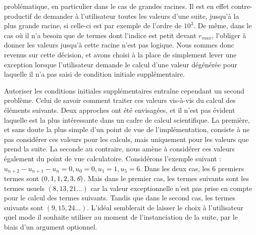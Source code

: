 \documentclass[12pt]{article}
\begin{document}
        problématique, en particulier dans le cas de grandes racines. Il est en effet
        contre-productif de demander à l'utilisateur toutes les valeurs d'une suite,
        jusqu'à la plus grande racine, si celle-ci est par exemple de l'ordre de $10^3$.
        De même, dans le cas où il n'a besoin que de termes dont l'indice est petit devant
        $r_{max}$, l'obliger à donner les valeurs jusqu'à cette racine n'est pas logique.
        Nous sommes donc revenus sur cette décision, et avons choisi à la place de simplement
        lever une exception lorsque l'utilisateur demande le calcul d'une valeur dégénérée
        pour laquelle il n'a pas saisi de condition initiale supplémentaire.
        \par Autoriser les conditions initiales supplémentaires entraîne cependant un second
        problème. Celui de savoir comment traiter ces valeurs vis-à-vis du calcul des
        éléments suivants. Deux approches ont été envisagées, et il n'est pas évident
        laquelle est la plus intéressante dans un cadre de calcul scientifique.
        La première, et sans doute la plus simple d'un point de vue de l'implémentation,
        consiste à ne pas considérer ces valeurs pour les calculs, mais uniquement
        pour les valeurs que prend la suite. La seconde au contraire, nous amène à considérer
        ces valeurs également du point de vue calculatoire. Considérons l'exemple suivant :
        $u_{n+2} - u_{n+1} - u_n = 0, u_0=0, u_1=1, u_5=6$. Dans les deux cas, les 6 premiers
        termes sont $(0,1,1,2,3,\emph{6})$. Mais dans le premier cas, les termes suivants sont
        les termes usuels $(8,13,21...)$ car la valeur exceptionnelle n'est pas prise en
        compte pour le calcul des termes suivants. Tandis que dans le second cas, les termes
        suivants sont $(9,15,24...)$. L'idéal semblerait de laisser le choix à l'utilisateur
        quel mode il souhaite utiliser au moment de l'instanciation de la suite, par le biais
        d'un argument optionnel.
\end{document}

